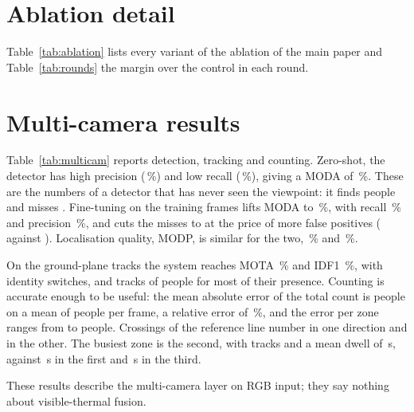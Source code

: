 

\section{Ablation detail}
\label{supp:ablation}
Table~\ref{tab:ablation} lists every variant of the ablation of the main paper and Table~\ref{tab:rounds} the margin over the control in each round.




\section{Multi-camera results}
\label{supp:multicam}
Table~\ref{tab:multicam} reports detection, tracking and counting. Zero-shot, the detector has high precision (\camDetZeroShotPrecision{}\,\%) and low recall (\camDetZeroShotRecall{}\,\%), giving a MODA of \camDetZeroShotModa{}\,\%. These are the numbers of a detector that has never seen the viewpoint: it finds \camDetZeroShotTp{} people and misses \camDetZeroShotFn{}. Fine-tuning on the training frames lifts MODA to \camDetFineTunedModa{}\,\%, with recall \camDetFineTunedRecall{}\,\% and precision \camDetFineTunedPrecision{}\,\%, and cuts the misses to \camDetFineTunedFn{} at the price of more false positives (\camDetFineTunedFp{} against \camDetZeroShotFp{}). Localisation quality, MODP, is similar for the two, \camDetZeroShotModp{}\,\% and \camDetFineTunedModp{}\,\%.

On the ground-plane tracks the system reaches MOTA \camTrackMota{}\,\% and IDF1 \camTrackIdfOne{}\,\%, with \camTrackSwitches{} identity switches, and tracks \camTrackMostlyTracked{} of \camTrackUniqueObjects{} people for most of their presence. Counting is accurate enough to be useful: the mean absolute error of the total count is \camCountMae{} people on a mean of \camCountMeanPeople{} people per frame, a relative error of \camCountRelErr{}\,\%, and the error per zone ranges from \camCountZoneThreeMae{} to \camCountZoneTwoMae{} people. Crossings of the reference line number \camCrossBackward{} in one direction and \camCrossForward{} in the other. The busiest zone is the second, with \camDwellZoneTwoTracks{} tracks and a mean dwell of \camDwellZoneTwoMeanS{}\,s, against \camDwellZoneOneMeanS{}\,s in the first and \camDwellZoneThreeMeanS{}\,s in the third.

These results describe the multi-camera layer on RGB input; they say nothing about visible-thermal fusion.

